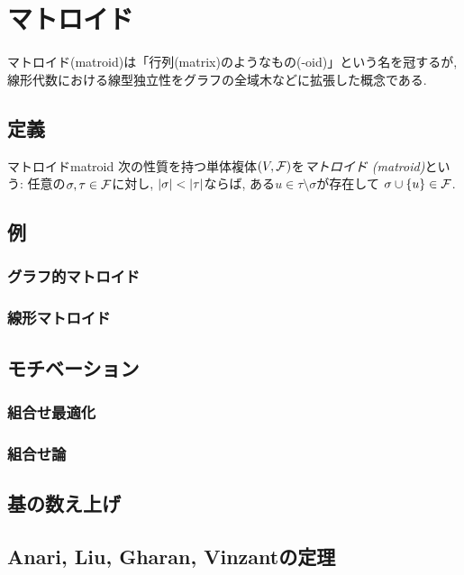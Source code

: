 \section{マトロイド}
マトロイド(matroid)は「行列(matrix)のようなもの(-oid)」という名を冠するが,
線形代数における線型独立性をグラフの全域木などに拡張した概念である.

\subsection{定義}
\begin{definition}{マトロイド}{matroid}
    次の性質を持つ単体複体$(V,\mathcal{F})$を\emph{マトロイド (matroid)}という:
    任意の$\sigma,\tau \in \mathcal{F}$に対し, $\lvert\sigma\rvert < \lvert\tau\rvert$ならば,
    ある$ u \in \tau \setminus \sigma$が存在して
    $\sigma \cup \lbrace u\rbrace \in \mathcal{F}$.
\end{definition}

\subsection{例}
\subsubsection{グラフ的マトロイド}
\subsubsection{線形マトロイド}
\subsection{モチベーション}
\subsubsection{組合せ最適化}
\subsubsection{組合せ論}
\subsection{基の数え上げ}
\subsection{Anari, Liu, Gharan, Vinzantの定理}
